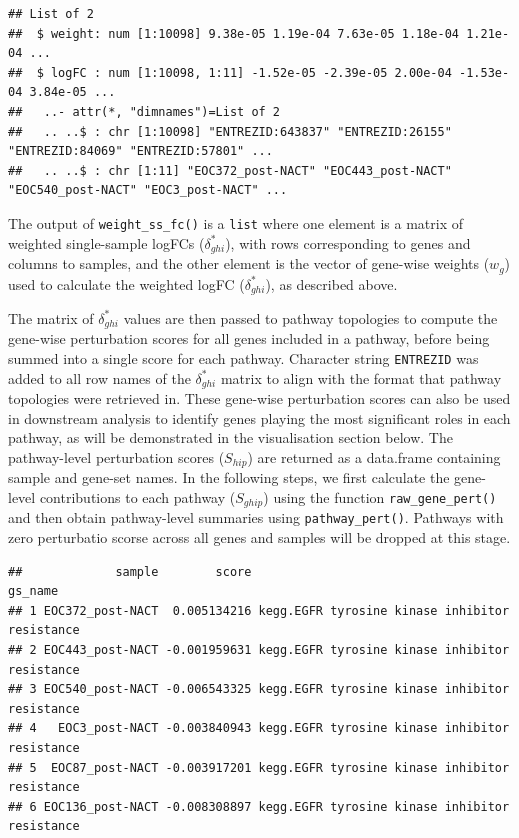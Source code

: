 \documentclass[9pt,a4paper,]{extarticle}
\newenvironment{Shaded}{\begin{snugshade}}{\end{snugshade}}
\newcommand{\FunctionTok}[1]{\textcolor[rgb]{0.00,0.00,0.00}{#1}}
\newcommand{\NormalTok}[1]{#1}
\newcommand{\OtherTok}[1]{\textcolor[rgb]{0.56,0.35,0.01}{#1}}
\newcommand{\SpecialCharTok}[1]{\textcolor[rgb]{0.00,0.00,0.00}{#1}}
\begin{document}
\begin{verbatim}
## List of 2
##  $ weight: num [1:10098] 9.38e-05 1.19e-04 7.63e-05 1.18e-04 1.21e-04 ...
##  $ logFC : num [1:10098, 1:11] -1.52e-05 -2.39e-05 2.00e-04 -1.53e-04 3.84e-05 ...
##   ..- attr(*, "dimnames")=List of 2
##   .. ..$ : chr [1:10098] "ENTREZID:643837" "ENTREZID:26155" "ENTREZID:84069" "ENTREZID:57801" ...
##   .. ..$ : chr [1:11] "EOC372_post-NACT" "EOC443_post-NACT" "EOC540_post-NACT" "EOC3_post-NACT" ...
\end{verbatim}

The output of \texttt{weight\_ss\_fc()} is a \texttt{list} where one element is a matrix of weighted single-sample logFCs (\(\delta_{ghi}^*\)), with rows corresponding to genes and columns to samples, and the other element is the vector of gene-wise weights (\(w_g\)) used to calculate the weighted logFC (\(\delta_{ghi}^*\)), as described above.

The matrix of \(\delta_{ghi}^*\) values are then passed to pathway topologies to compute the gene-wise perturbation scores for all genes included in a pathway, before being summed into a single score for each pathway.
Character string \texttt{ENTREZID} was added to all row names of the \(\delta_{ghi}^*\) matrix to align with the format that pathway topologies were retrieved in.
These gene-wise perturbation scores can also be used in downstream analysis to identify genes playing the most significant roles in each pathway, as will be demonstrated in the visualisation section below.
The pathway-level perturbation scores (\(S_{hip}\)) are returned as a data.frame containing sample and gene-set names.
In the following steps, we first calculate the gene-level contributions to each pathway (\(S_{ghip}\)) using the function \texttt{raw\_gene\_pert()} and then obtain pathway-level summaries using \texttt{pathway\_pert()}.
Pathways with zero perturbatio scorse across all genes and samples will be dropped at this stage.

\begin{Shaded}
\end{Shaded}

\begin{verbatim}
##             sample        score                                        gs_name
## 1 EOC372_post-NACT  0.005134216 kegg.EGFR tyrosine kinase inhibitor resistance
## 2 EOC443_post-NACT -0.001959631 kegg.EGFR tyrosine kinase inhibitor resistance
## 3 EOC540_post-NACT -0.006543325 kegg.EGFR tyrosine kinase inhibitor resistance
## 4   EOC3_post-NACT -0.003840943 kegg.EGFR tyrosine kinase inhibitor resistance
## 5  EOC87_post-NACT -0.003917201 kegg.EGFR tyrosine kinase inhibitor resistance
## 6 EOC136_post-NACT -0.008308897 kegg.EGFR tyrosine kinase inhibitor resistance
\end{verbatim}
\end{document}
